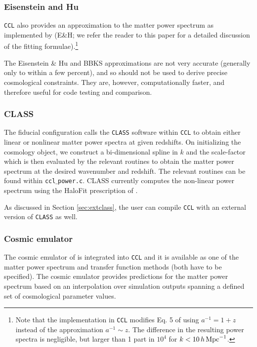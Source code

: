 \documentclass[\docopts]{\docclass}
\newcommand{\ccl}{{\tt CCL}\xspace}
\begin{document}
\subsubsection{Eisenstein and Hu}
\ccl also provides an approximation to the matter power spectrum as implemented by \citet{1998ApJ...496..605E} (E\&H; we refer the reader to this paper for a detailed discussion of the fitting formulae).\footnote{Note that the implementation in \ccl modifies Eq. 5 of \citet{1998ApJ...496..605E} using $a^{-1}=1+z$ instead of the approximation $a^{-1}\sim z$. The difference in the resulting power spectra is negligible, but larger than 1 part in $10^4$ for $k<10\,h\,{\rm Mpc}^{-1}$.}

The Eisenstein \& Hu and BBKS approximations are not very accurate (generally only to within a few percent), and so should not be used to derive precise cosmological constraints. They are, however, computationally faster, and therefore useful for code testing and comparison.

\subsubsection{CLASS}
The fiducial configuration calls the {\tt CLASS} software \citep{class} within \ccl to obtain either linear or nonlinear matter power spectra at given redshifts. On initializing the cosmology object, we construct a bi-dimensional spline in $k$ and the scale-factor which is then evaluated by the relevant routines to obtain the matter power spectrum at the desired wavenumber and redshift. The relevant routines can be found within {\tt ccl$\_$power.c}. CLASS currently computes the non-linear power spectrum using the HaloFit prescription of \cite{CLASS_halofit}.

As discussed in Section \ref{sec:extclass}, the user can compile \ccl with an external version of {\tt CLASS} as well.

\subsubsection{Cosmic emulator}

The cosmic emulator of \citet{Lawrence17} is integrated into \ccl and it is available as one of the matter power spectrum and transfer function methods (both have to be specified). The cosmic emulator provides predictions for the matter power spectrum based on an interpolation over simulation outputs spanning a defined set of cosmological parameter values.
\end{document}
